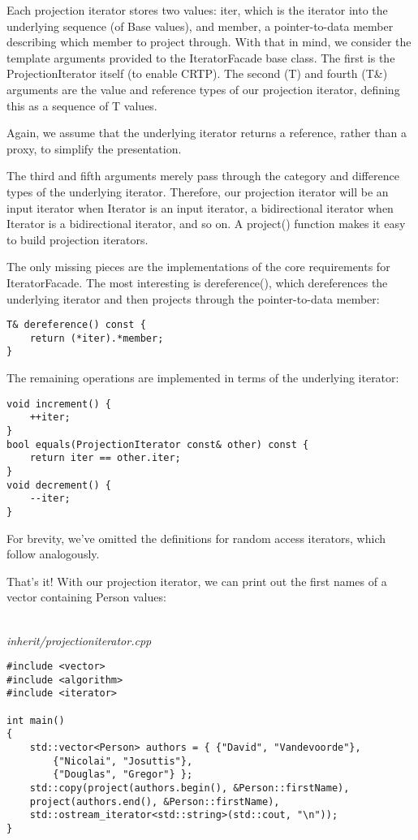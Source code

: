 Each projection iterator stores two values: iter, which is the iterator into the underlying sequence (of Base values), and member, a pointer-to-data member describing which member to project through. With that in mind, we consider the template arguments provided to the IteratorFacade base class. The first is the ProjectionIterator itself (to enable CRTP). The second (T) and fourth (T\&) arguments are the value and reference types of our projection iterator, defining this as a sequence of T values.

\begin{tcolorbox}[colback=webgreen!5!white,colframe=webgreen!75!black]
\hspace*{0.75cm}Again, we assume that the underlying iterator returns a reference, rather than a proxy, to simplify the presentation.
\end{tcolorbox}

The third and fifth arguments merely pass through the category and difference types of the underlying iterator. Therefore, our projection iterator will be an input iterator when Iterator is an input iterator, a bidirectional iterator when Iterator is a bidirectional iterator, and so on. A project() function makes it easy to build projection iterators.

The only missing pieces are the implementations of the core requirements for IteratorFacade. The most interesting is dereference(), which dereferences the underlying iterator and then projects through the pointer-to-data member:

\begin{lstlisting}[style=styleCXX]
T& dereference() const {
	return (*iter).*member;
}
\end{lstlisting}

The remaining operations are implemented in terms of the underlying iterator:

\begin{lstlisting}[style=styleCXX]
void increment() {
	++iter;
}
bool equals(ProjectionIterator const& other) const {
	return iter == other.iter;
}
void decrement() {
	--iter;
}
\end{lstlisting}

For brevity, we’ve omitted the definitions for random access iterators, which follow analogously.

That’s it! With our projection iterator, we can print out the first names of a vector containing Person values:

\hspace*{\fill} \\ %
\noindent
\textit{inherit/projectioniterator.cpp}
\begin{lstlisting}[style=styleCXX]
#include <vector>
#include <algorithm>
#include <iterator>

int main()
{
	std::vector<Person> authors = { {"David", "Vandevoorde"},
		{"Nicolai", "Josuttis"},
		{"Douglas", "Gregor"} };
	std::copy(project(authors.begin(), &Person::firstName),
	project(authors.end(), &Person::firstName),
	std::ostream_iterator<std::string>(std::cout, "\n"));
}
\end{lstlisting}

